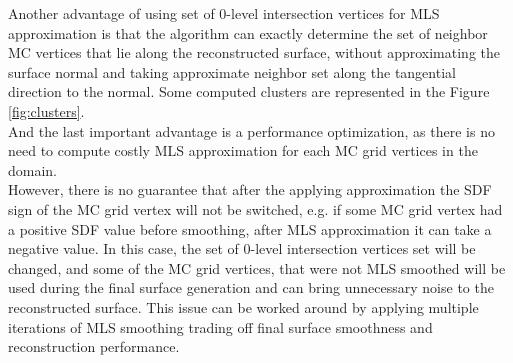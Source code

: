 Another advantage of using set of 0-level intersection vertices for MLS approximation is that the algorithm can exactly determine the set of neighbor MC vertices that lie along the reconstructed surface, without approximating the surface normal and taking approximate neighbor set along the tangential direction to the normal. Some computed clusters are represented in the Figure \ref{fig:clusters}.\\

And the last important advantage is a performance optimization, as there is no need to compute costly MLS approximation for each MC grid vertices in the domain.\\

However, there is no guarantee that after the applying approximation the SDF sign of the MC grid vertex will not be switched, e.g. if some MC grid vertex had a positive SDF value before smoothing, after MLS approximation it can take a negative value. In this case, the set of 0-level intersection vertices set will be changed, and some of the MC grid vertices, that were not MLS smoothed will be used during the final surface generation and can bring unnecessary noise to the reconstructed surface. This issue can be worked around by applying multiple iterations of MLS smoothing trading off final surface smoothness and reconstruction performance.\\
